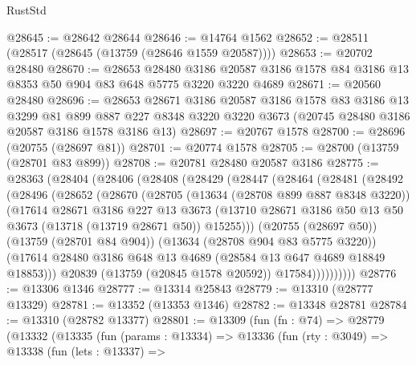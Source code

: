 \begin{lexlean}{RustStd}
\begin{coremodule}
@28645 := @28642 @28644
@28646 := @14764 @1562
@28652 := @28511 (@28517 (@28645 (@13759 (@28646 @1559 @20587))))
@28653 := @20702 @28480
@28670 := @28653
    @28480
    @3186
    @20587
    @3186
    @1578
    @84
    @3186
    @13
    @8353
    @50
    @904
    @83
    @648
    @5775
    @3220
    @3220
    @4689
@28671 := @20560 @28480
@28696 := @28653
    @28671
    @3186
    @20587
    @3186
    @1578
    @83
    @3186
    @13
    @3299
    @81
    @899
    @887
    @227
    @8348
    @3220
    @3220
    @3673
    (@20745 @28480 @3186 @20587 @3186 @1578 @3186 @13)
@28697 := @20767 @1578
@28700 := @28696 (@20755 (@28697 @81))
@28701 := @20774 @1578
@28705 := @28700 (@13759 (@28701 @83 @899))
@28708 := @20781 @28480 @20587 @3186
@28775 := @28363
    (@28404
      (@28406
        (@28408
          (@28429
            (@28447
              (@28464
                (@28481
                  (@28492
                    (@28496
                      (@28652
                        (@28670
                          (@28705
                            (@13634 (@28708 @899 @887 @8348 @3220))
                            (@17614
                              @28671
                              @3186
                              @227
                              @13
                              @3673
                              (@13710
                                @28671
                                @3186
                                @50
                                @13
                                @50
                                @3673
                                (@13718 (@13719 @28671 @50))
                                @15255)))
                          (@20755 (@28697 @50))
                          (@13759 (@28701 @84 @904))
                          (@13634 (@28708 @904 @83 @5775 @3220))
                          (@17614
                            @28480
                            @3186
                            @648
                            @13
                            @4689
                            (@28584 @13 @647 @4689 @18849 @18853)))
                        @20839
                        (@13759 (@20845 @1578 @20592))
                        @17584))))))))))
@28776 := @13306 @1346
@28777 := @13314 @25843
@28779 := @13310 (@28777 @13329)
@28781 := @13352 (@13353 @1346)
@28782 := @13348 @28781
@28784 := @13310 (@28782 @13377)
@28801 := @13309
    (fun (fn : @74) =>
    @28779
      (@13332
        (@13335
          (fun (params : @13334) =>
          @13336
            (fun (rty : @3049) =>
            @13338
              (fun (lets : @13337) =>

\end{coremodule}
\end{lexlean}
